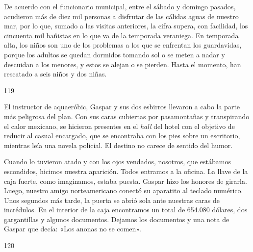 \documentclass[12pt,twoside,openright,a5paper]{book}
\begin{document}
De acuerdo con el funcionario municipal, entre el sábado y domingo pasados,
acudieron más de diez mil personas a disfrutar de las cálidas aguas de
nuestro mar, por lo que, sumado a las visitas anteriores, la cifra supera,
con facilidad, los cincuenta mil bañistas en lo que va de la temporada
veraniega. En temporada alta, los niños
son uno de los problemas a los que se enfrentan los guardavidas, porque
los adultos se quedan dormidos tomando sol o se meten a nadar y descuidan a
los menores, y estos se alejan o se pierden. Hasta el momento, han rescatado
a seis niños y dos niñas.

\vspace{0.5cm}

\hrulefill \hspace{0.1cm}\decofourleft\hspace{0.2cm} 119 \hspace{0.2cm}\decofourright \hspace{0.1cm}\hrulefill

\nopagebreak

\vspace{0.5cm}

\nopagebreak

El instructor de
aquaeróbic, Gaspar y sus dos esbirros llevaron a cabo
la parte más peligrosa del plan. Con sus caras cubiertas por
pasamontañas y transpirando el calor mexicano, se hicieron presentes en
el \emph{hall} del hotel con el objetivo de reducir al casual encargado, que se
encontraba con los pies sobre un escritorio, mientras leía una novela policial. El
destino no carece de sentido del humor.

Cuando lo tuvieron atado y con los ojos vendados, nosotros, que estábamos
escondidos, hicimos nuestra aparición. Todos entramos a la oficina.  La llave
de la caja fuerte, como imaginamos, estaba puesta. Gaspar hizo los honores
de girarla. Luego, nuestro amigo norteamericano conectó su aparatito al
teclado numérico. Unos segundos más tarde, la puerta se abrió sola ante
nuestras caras de incrédulos. En el interior de la caja encontramos un
total de 654.080 dólares, dos gargantillas y algunos documentos. Dejamos
los documentos y una nota de Gaspar que decía: «Los anonas no se comen».


\vspace{0.5cm}

\hrulefill \hspace{0.1cm}\decofourleft\hspace{0.2cm} 120 \hspace{0.2cm}\decofourright \hspace{0.1cm}\hrulefill
\end{document}
